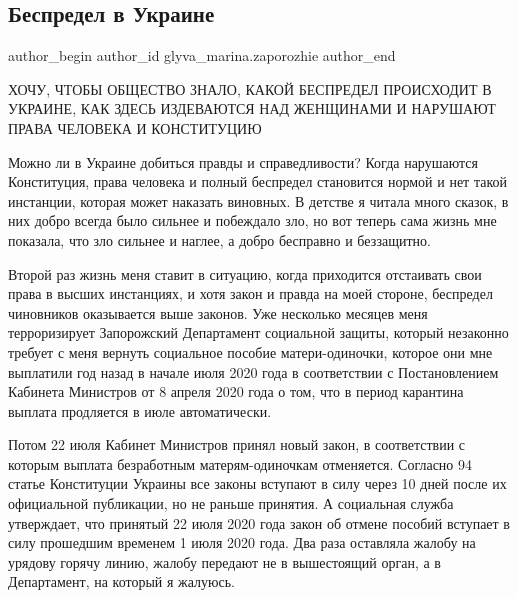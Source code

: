  
 
 
 
 
 
\subsection{Беспредел в Украине}
\label{sec:28_08_2021.fb.glyva_marina.zaporozhie.1.bespredel_ukraina}
 
\ifcmt
 author_begin
   author_id glyva_marina.zaporozhie
 author_end
\fi

ХОЧУ, ЧТОБЫ ОБЩЕСТВО  ЗНАЛО, КАКОЙ БЕСПРЕДЕЛ ПРОИСХОДИТ В УКРАИНЕ, КАК ЗДЕСЬ
ИЗДЕВАЮТСЯ НАД ЖЕНЩИНАМИ  И НАРУШАЮТ ПРАВА ЧЕЛОВЕКА И КОНСТИТУЦИЮ

Можно ли в Украине добиться правды и справедливости? Когда нарушаются
Конституция, права человека и полный беспредел становится нормой и нет такой
инстанции, которая может наказать виновных. В детстве я читала много сказок, в
них добро всегда было сильнее и побеждало зло, но вот теперь сама жизнь мне
показала, что зло сильнее и наглее,  а добро бесправно и беззащитно. 

Второй раз жизнь меня ставит в ситуацию, когда приходится отстаивать свои права
в высших инстанциях, и хотя закон и правда на моей стороне, беспредел
чиновников оказывается выше законов. Уже несколько месяцев меня терроризирует
Запорожский Департамент социальной защиты, который незаконно требует с меня
вернуть социальное пособие матери-одиночки, которое они  мне выплатили год
назад в начале июля 2020 года в соответствии с Постановлением Кабинета
Министров от 8 апреля 2020 года о том, что в период карантина выплата
продляется в июле автоматически. 

Потом 22 июля Кабинет Министров принял новый закон, в соответствии с которым
выплата безработным матерям-одиночкам отменяется.  Согласно 94 статье
Конституции Украины все законы вступают в силу через 10 дней после их
официальной публикации, но не раньше принятия. А социальная служба утверждает,
что принятый 22 июля 2020 года закон об отмене пособий вступает в силу
прошедшим временем 1 июля 2020 года. Два раза оставляла жалобу на урядову
горячу линию, жалобу передают не в вышестоящий орган, а в Департамент, на
который я жалуюсь. 

